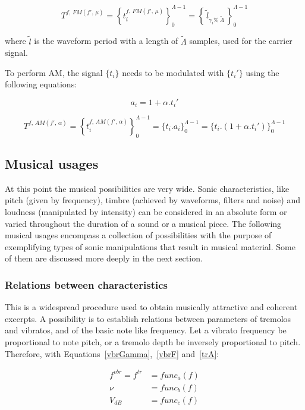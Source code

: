 \begin{equation}\label{fmT}
T^{f,\, FM(f',\,\mu)}=\left\{ t_i^{f,\,FM(f',\,\mu)} \right\}_0^{\Lambda-1}=\left\{\,\widetilde{l}_{\gamma_i \%\; \widetilde{\Lambda} } \,\right\}_0^{\Lambda-1}
\end{equation}


\noindent where $\widetilde{l}$ is the waveform period with a length of $\widetilde{\Lambda}$ samples, used for the carrier signal.

To perform AM, the signal $\{t_i\}$ needs to be modulated with $\{t_i'\}$ using the following equations:

\begin{equation}\label{amA}
a_i=1 + \alpha . t_i'
\end{equation}

\begin{equation}\label{amT}
T^{f,\,AM(f',\,\alpha)}=\left\{ t_i^{f,\,AM(f',\,\alpha)} \right\}_0^{\Lambda-1}=\{ t_i . a_i \}_0^{\Lambda-1}= \{t_i . (1 + \alpha . t_i')    \}_0^{\Lambda-1}
\end{equation}

\subsection{Musical usages}\label{subsec:mus2}
At this point the musical possibilities are very wide.
Sonic characteristics, like pitch (given by frequency),
timbre (achieved by waveforms, filters and noise) and loudness (manipulated by intensity)
can be considered in an absolute form or varied throughout the duration of a sound
or a musical piece.
The following musical usages encompass a collection of possibilities with the purpose of exemplifying types of sonic manipulations that result in musical material.
Some of them are discussed more deeply in the next section.

\subsubsection{Relations between characteristics}
This is a widespread procedure used to obtain musically attractive and coherent excerpts.
A possibility is to establish relations between parameters of
tremolos and vibratos, and of the basic note like frequency.
Let a vibrato frequency be proportional
to note pitch, or a tremolo depth be inversely proportional to
pitch. Therefore, with Equations~\ref{vbrGamma},~\ref{vbrF} and~\ref{trA}:

\begin{equation}\label{eq:vinculos}
\begin{split}
f^{vbr} = f^{tr} & = func_a(f) \\
\nu & = func_b(f) \\
V_{dB} & = func_c(f)
\end{split}
\end{equation}

